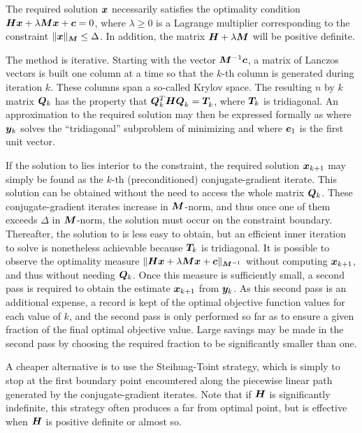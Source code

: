 \documentclass{galahad}
\begin{document}

\galmethod
The required solution ${\bm{x}}$ necessarily satisfies the optimality condition
${\bm{H}} {\bm{x}} + \lambda {\bm{M}} {\bm{x}} + {\bm{c}} = 0$, where $\lambda \geq 0$
is a Lagrange
multiplier corresponding to the constraint $\|{\bm{x}}\|_{{\bm{M}}}  \leq  \Delta$.
In addition, the matrix ${\bm{H}} + \lambda {\bm{M}}$ will be positive definite.

\noindent
The method is iterative. Starting  with the vector ${\bm{M}}^{-1} {\bm{c}}$,
a matrix of Lanczos vectors is built one column at a time
so that the $k$-th column is generated during
iteration $k$. These columns span a so-called Krylov space.
The resulting $n$ by $k$ matrix ${\bm{Q}}_k $ has the
property that ${\bm{Q}}_{k}^T {\bm{H}} {\bm{Q}}_k^{}  =  {\bm{T}}_{k}^{}$,
where ${\bm{T}}_k$ is tridiagonal. An approximation to the
required solution may then be expressed formally as
where ${\bm{y}}_k $ solves the ``tridiagonal'' subproblem of minimizing
and where ${\bm{e}}_1$ is the first unit vector.

If the solution to  lies interior to the constraint, the required
solution ${\bm{x}}_{k+1}$ may simply be found as the $k$-th (preconditioned)
conjugate-gradient iterate. This solution can be obtained without the need to
access the whole matrix ${\bm{Q}}_k$.
These conjugate-gradient iterates increase in ${\bm{M}}$-norm, and
thus once one of them exceeds $\Delta$ in ${\bm{M}}$-norm, the solution must occur
on the constraint boundary. Thereafter, the solution to  is less
easy to obtain, but an efficient inner iteration to solve  is
nonetheless achievable because ${\bm{T}}_k $ is tridiagonal.
It is possible to observe the optimality measure
$\|{\bm{H}} {\bm{x}}  +  \lambda {\bm{M}} {\bm{x}}  +  {\bm{c}}\|_{{\bm{M}}^{-1}}$
without computing ${\bm{x}}_{k+1}$, and thus without
needing ${\bm{Q}}_k $. Once this measure is sufficiently small, a second pass
is required to obtain the estimate ${\bm{x}}_{k+1} $ from ${\bm{y}}_k $.
As this second pass is an additional expense, a record is kept of the
optimal objective function values for each value of $k$, and the second
pass is only performed so far as to ensure a given fraction of the
final optimal objective value. Large savings may be made in the second
pass by choosing the required fraction to be significantly smaller than one.

A cheaper alternative is to use the Steihuag-Toint strategy, which is simply
to stop at the first boundary point encountered along the piecewise
linear path generated by the conjugate-gradient iterates. Note that if
${\bm{H}}$ is significantly indefinite, this strategy often produces a far from
optimal point, but is effective when ${\bm{H}}$ is positive definite or almost
so.
\end{document}
